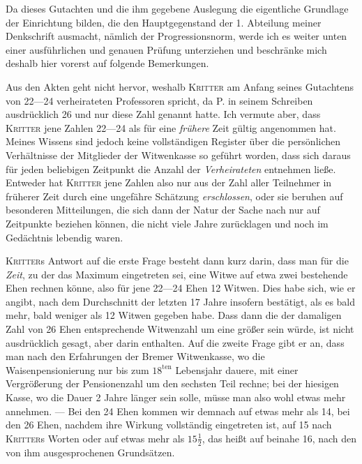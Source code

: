 \par{}
Da dieses Gutachten und die ihm gegebene Auslegung die eigentliche Grundlage der Einrichtung bilden, die den Hauptgegenstand der 1. Abteilung meiner Denkschrift ausmacht, nämlich der Progressionsnorm, werde ich es weiter unten einer ausführlichen und genauen Prüfung unterziehen und beschränke mich deshalb hier vorerst auf folgende Bemerkungen.

Aus den Akten geht nicht hervor, weshalb \textsc{Kritter} am Anfang seines Gutachtens von 22—24 verheirateten Professoren spricht, da P. in seinem Schreiben ausdrücklich 26 und nur diese Zahl genannt hatte. Ich vermute aber, dass \textsc{Kritter} jene Zahlen 22—24 als für eine \textit{frühere} Zeit gültig angenommen hat. Meines Wissens sind jedoch keine vollständigen Register über die persönlichen Verhältnisse der Mitglieder der Witwenkasse so geführt worden, dass sich daraus für jeden beliebigen Zeitpunkt die Anzahl der \textit{Verheirateten} entnehmen ließe. Entweder hat \textsc{Kritter} jene Zahlen also nur aus der Zahl aller Teilnehmer in früherer Zeit durch eine ungefähre Schätzung \textit{erschlossen}, oder sie beruhen auf besonderen Mitteilungen, die sich dann der Natur der Sache nach nur auf Zeitpunkte beziehen können, die nicht viele Jahre zurücklagen und noch im Gedächtnis lebendig waren.

\textsc{Kritter}s Antwort auf die erste Frage besteht dann kurz darin, dass man für die \textit{Zeit}, zu der das Maximum eingetreten sei, eine Witwe auf etwa zwei bestehende Ehen rechnen könne, also für jene 22—24 Ehen 12 Witwen. Dies habe sich, wie er angibt, nach dem Durchschnitt der letzten 17 Jahre insofern bestätigt, als es bald mehr, bald weniger als 12 Witwen gegeben habe. Dass dann die der damaligen Zahl von 26 Ehen entsprechende Witwenzahl um eine größer sein würde, ist nicht ausdrücklich gesagt, aber darin enthalten. Auf die zweite Frage gibt er an, dass man nach den Erfahrungen der Bremer Witwenkasse, wo die Waisenpensionierung nur bis zum \(18^{\text{ten}}\) Lebensjahr dauere, mit einer Vergrößerung der Pensionenzahl um den sechsten Teil rechne; bei der hiesigen Kasse, wo die Dauer 2 Jahre länger sein solle, müsse man also wohl etwas mehr annehmen. — Bei den 24 Ehen kommen wir demnach auf etwas mehr als 14, bei den 26 Ehen, nachdem ihre Wirkung vollständig eingetreten ist, auf 15 nach \textsc{Kritter}s Worten oder auf etwas mehr als \(15\tfrac12\), das heißt auf beinahe 16, nach den von ihm ausgesprochenen Grundsätzen.

